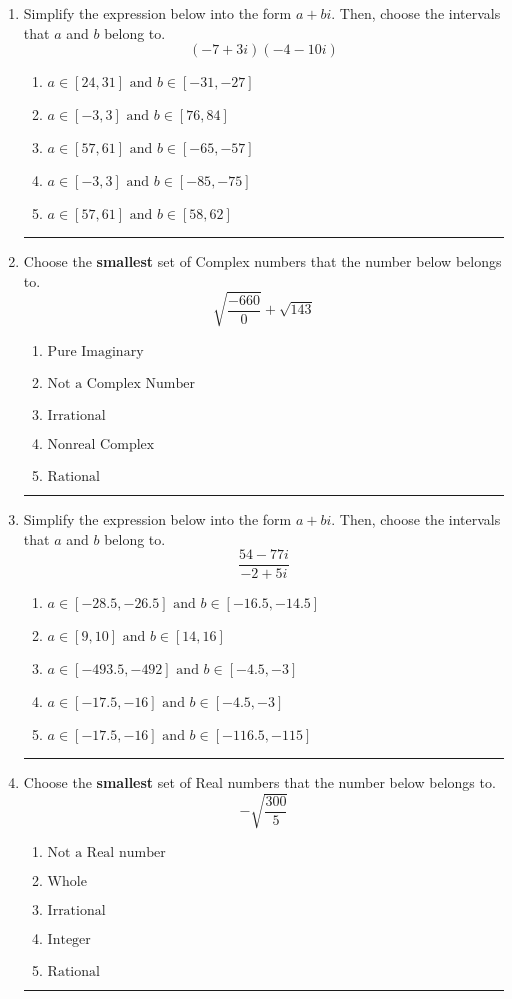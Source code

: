 \documentclass[14pt]{extbook}
\newcommand{\litem}[1]{\item#1\hspace*{-1cm}\rule{\textwidth}{0.4pt}}
\begin{document}
\begin{enumerate}
\litem{
Simplify the expression below into the form $a+bi$. Then, choose the intervals that $a$ and $b$ belong to.\[ (-7 + 3 i)(-4 - 10 i) \]\begin{enumerate}[label=\Alph*.]
\item \( a \in [24, 31] \text{ and } b \in [-31, -27] \)
\item \( a \in [-3, 3] \text{ and } b \in [76, 84] \)
\item \( a \in [57, 61] \text{ and } b \in [-65, -57] \)
\item \( a \in [-3, 3] \text{ and } b \in [-85, -75] \)
\item \( a \in [57, 61] \text{ and } b \in [58, 62] \)

\end{enumerate} }
\litem{
Choose the \textbf{smallest} set of Complex numbers that the number below belongs to.\[ \sqrt{\frac{-660}{0}}+\sqrt{143} \]\begin{enumerate}[label=\Alph*.]
\item \( \text{Pure Imaginary} \)
\item \( \text{Not a Complex Number} \)
\item \( \text{Irrational} \)
\item \( \text{Nonreal Complex} \)
\item \( \text{Rational} \)

\end{enumerate} }
\litem{
Simplify the expression below into the form $a+bi$. Then, choose the intervals that $a$ and $b$ belong to.\[ \frac{54 - 77 i}{-2 + 5 i} \]\begin{enumerate}[label=\Alph*.]
\item \( a \in [-28.5, -26.5] \text{ and } b \in [-16.5, -14.5] \)
\item \( a \in [9, 10] \text{ and } b \in [14, 16] \)
\item \( a \in [-493.5, -492] \text{ and } b \in [-4.5, -3] \)
\item \( a \in [-17.5, -16] \text{ and } b \in [-4.5, -3] \)
\item \( a \in [-17.5, -16] \text{ and } b \in [-116.5, -115] \)

\end{enumerate} }
\litem{
Choose the \textbf{smallest} set of Real numbers that the number below belongs to.\[ -\sqrt{\frac{300}{5}} \]\begin{enumerate}[label=\Alph*.]
\item \( \text{Not a Real number} \)
\item \( \text{Whole} \)
\item \( \text{Irrational} \)
\item \( \text{Integer} \)
\item \( \text{Rational} \)


\end{enumerate}}
\end{enumerate}
\end{document}
